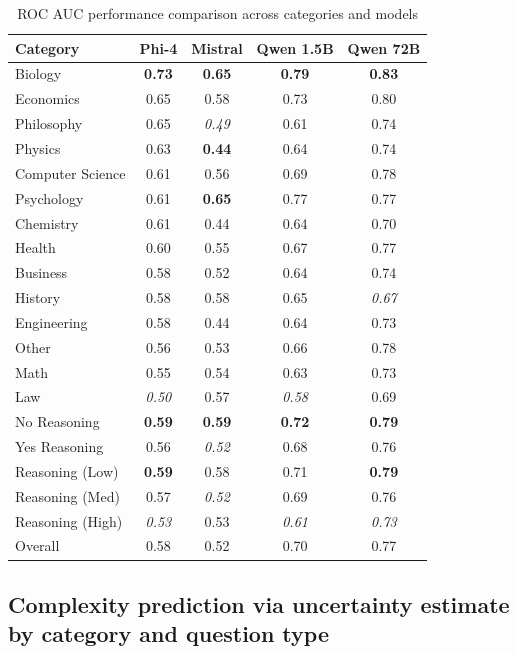 \begin{table}[htbp]
\centering
\renewcommand{\arraystretch}{1.2}
\begin{tabular}{lcccc}
\hline
Category & Phi-4 & Mistral & Qwen 1.5B & Qwen 72B \\
\hline
Biology & \textbf{0.73} & \textbf{0.65} & \textbf{0.79} & \textbf{0.83} \\
Economics & 0.65 & 0.58 & 0.73 & 0.80 \\
Philosophy & 0.65 & \textit{0.49} & 0.61 & 0.74 \\
Physics & 0.63 & \textbf{0.44} & 0.64 & 0.74 \\
Computer Science & 0.61 & 0.56 & 0.69 & {0.78} \\
Psychology & 0.61 &\textbf{0.65} & 0.77 & 0.77 \\
Chemistry & 0.61 & 0.44 & 0.64 & 0.70 \\
Health & 0.60 & 0.55 & 0.67 & 0.77 \\
Business & 0.58 & 0.52 & 0.64 & 0.74 \\
History & 0.58 & 0.58 & 0.65 & \textit{0.67} \\
Engineering & 0.58 & 0.44 & 0.64 & 0.73 \\
Other & 0.56 & 0.53 & 0.66 & {0.78} \\
Math & 0.55 & 0.54 & 0.63 & 0.73 \\
Law & \textit{0.50} & 0.57 & \textit{0.58} & 0.69 \\
\hline
No Reasoning & \textbf{0.59} & \textbf{0.59} & \textbf{0.72} & \textbf{0.79} \\
Yes Reasoning & 0.56 & \textit{0.52} & 0.68 & 0.76 \\
Reasoning (Low) & \textbf{0.59} & 0.58 & 0.71 & \textbf{0.79} \\
Reasoning (Med) & 0.57 & \textit{0.52} & 0.69 & 0.76 \\
Reasoning (High) & \textit{0.53} & 0.53 & \textit{0.61} & \textit{0.73} \\
\hline
Overall & 0.58 & 0.52 & 0.70 & 0.77 \\
\hline
\end{tabular}
\caption{ROC AUC performance comparison across categories and models}
\label{tab:rocauc}
\end{table}

\subsection{Complexity prediction via uncertainty estimate by category and question type}

